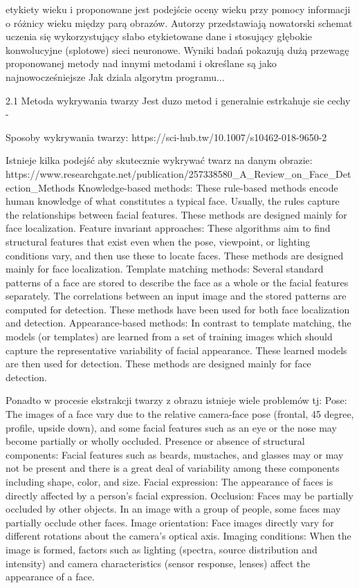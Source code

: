etykiety wieku i proponowane jest podejście oceny wieku przy pomocy informacji o różnicy wieku między parą obrazów. Autorzy przedstawiają nowatorski schemat uczenia się wykorzystujący słabo etykietowane dane i stosujący głębokie konwolucyjne (splotowe) sieci neuronowe. Wyniki badań pokazują dużą przewagę proponowanej metody nad innymi metodami i określane są jako najnowocześniejsze
Jak dziala algorytm programu...

2.1 Metoda wykrywania twarzy
Jest duzo metod i generalnie estrkahuje sie cechy -

Sposoby wykrywania twarzy:
https://sci-hub.tw/10.1007/s10462-018-9650-2


Istnieje kilka podejść aby skutecznie wykrywać twarz na danym obrazie:
https://www.researchgate.net/publication/257338580_A_Review_on_Face_Detection_Methods
Knowledge-based methods: These rule-based methods encode human knowledge
of what constitutes a typical face. Usually, the rules capture the relationships
between facial features. These methods are designed mainly for face localization.
Feature invariant approaches: These algorithms aim to find structural features that
exist even when the pose, viewpoint, or lighting conditions vary, and then use these
to locate faces. These methods are designed mainly for face localization.
Template matching methods: Several standard patterns of a face are stored to
describe the face as a whole or the facial features separately. The correlations
between an input image and the stored patterns are computed for detection. These
methods have been used for both face localization and detection.
Appearance-based methods: In contrast to template matching, the models (or
templates) are learned from a set of training images which should capture the
representative variability of facial appearance. These learned models are then used
for detection. These methods are designed mainly for face detection.

Ponadto w procesie ekstrakcji twarzy z obrazu istnieje wiele problemów tj:
Pose: The images of a face vary due to the relative camera-face pose (frontal, 45
degree, profile, upside down), and some facial features such as an eye or the nose
may become partially or wholly occluded.
Presence or absence of structural components: Facial features such as beards,
mustaches, and glasses may or may not be present and there is a great deal of
variability among these components including shape, color, and size.
Facial expression: The appearance of faces is directly affected by a person’s facial
expression.
Occlusion: Faces may be partially occluded by other objects. In an image with a
group of people, some faces may partially occlude other faces.
Image orientation: Face images directly vary for different rotations about the
camera’s optical axis.
Imaging conditions: When the image is formed, factors such as lighting (spectra,
source distribution and intensity) and camera characteristics (sensor response,
lenses) affect the appearance of a face.

